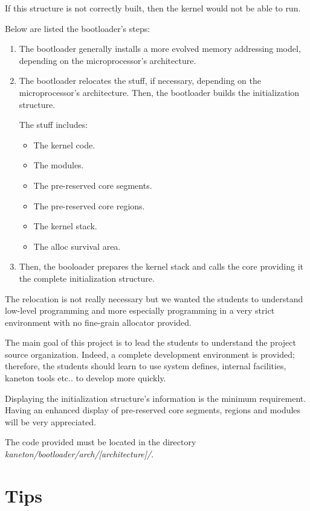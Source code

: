 If this structure is not correctly built, then the kernel would not
be able to run.

Below are listed the bootloader's steps:

\begin{enumerate}
  \item
    The bootloader generally installs a more evolved memory addressing model,
    depending on the microprocessor's architecture.
  \item
    The bootloader relocates the stuff, if necessary, depending on the
    microprocessor's architecture. Then, the bootloader builds the
    initialization structure.

    The stuff includes:

    \begin{itemize}
      \item
	The kernel code.
      \item
	The modules.
      \item
	The pre-reserved core segments.
      \item
	The pre-reserved core regions.
      \item
	The kernel stack.
      \item
	The alloc survival area.
    \end{itemize}
  \item
    Then, the booloader prepares the kernel stack and calls the core
    providing it the complete initialization structure.
\end{enumerate}

The relocation is not really necessary but we wanted the students
to understand low-level programming and more especially programming
in a very strict environment with no fine-grain allocator provided.

The main goal of this project is to lead the students to understand the
project source organization. Indeed, a complete development environment
is provided; therefore, the students should learn to use system defines,
internal facilities, kaneton tools etc.. to develop more quickly.

Displaying the initialization structure's information is the
minimum requirement. Having an enhanced display of pre-reserved core
segments, regions and modules will be very appreciated.

The code provided must be located in the directory
\textit{kaneton/bootloader/arch/[architecture]/}.

%
%

\section{Tips}

